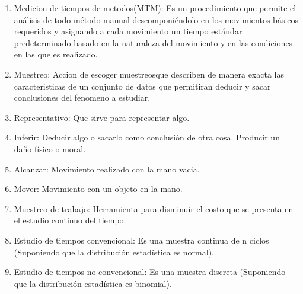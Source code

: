 \begin{enumerate}
    \cite{DiapositivasSema-2-21}
    \item Medicion de tiempos de metodos(MTM): Es un procedimiento que permite el análisis de todo método manual descomponiéndolo en los movimientos básicos requeridos y asignando a cada movimiento un tiempo estándar predeterminado basado en la naturaleza del movimiento y en las condiciones en las que es realizado.
    \item Muestreo: Accion de escoger muestreosque describen de manera exacta las caracteristicas de un conjunto de datos que permitiran deducir y sacar conclusiones del fenomeno a estudiar.
    \cite{DiapositivasSema-4-04}
    \item Representativo: Que sirve para representar algo.
    \cite{DiapositivasSema-4-04}
    \item Inferir:  Deducir algo o sacarlo como conclusión de otra cosa. Producir un daño físico o moral.
    \cite{asalerae2023}
    \item Alcanzar: Movimiento realizado con la mano vacia.
    \cite{asale_rae_2023}
    \item Mover: Movimiento con un objeto en la mano.
    \cite{DiapositivasSema-2-22}
    \item Muestreo de trabajo: Herramienta para disminuir el costo que se presenta en el estudio continuo del tiempo.
    \cite{DiapositivasSema-4-04}
    \item Estudio de tiempos convencional: Es una muestra continua de n ciclos (Suponiendo que la distribución estadística es normal).
    \cite{DiapositivasSema-4-04}
    \item Estudio de tiempos no convencional: Es una muestra discreta (Suponiendo que la distribución estadística es binomial).
    \cite{DiapositivasSema-4-04}
\end{enumerate}


